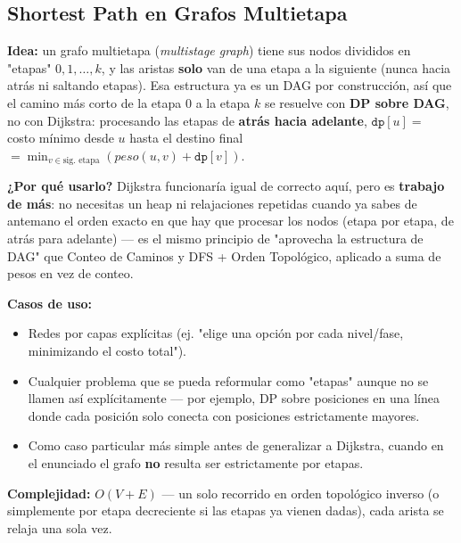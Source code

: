 \documentclass[10pt,a4paper,twocolumn]{article}
\begin{document}
\subsection{Shortest Path en Grafos Multietapa}

\textbf{Idea:} un grafo multietapa (\textit{multistage graph}) tiene
sus nodos divididos en "etapas" $0, 1, \dots, k$, y las aristas
\textbf{solo} van de una etapa a la siguiente (nunca hacia atrás ni
saltando etapas). Esa estructura ya es un DAG por construcción, así
que el camino más corto de la etapa $0$ a la etapa $k$ se resuelve
con \textbf{DP sobre DAG}, no con Dijkstra: procesando las etapas de
\textbf{atrás hacia adelante}, $\texttt{dp}[u] = $ costo mínimo desde
$u$ hasta el destino final $= \min_{v \in \text{sig. etapa}}
(peso(u,v) + \texttt{dp}[v])$.

\textbf{¿Por qué usarlo?} Dijkstra funcionaría igual de correcto
aquí, pero es \textbf{trabajo de más}: no necesitas un heap ni
relajaciones repetidas cuando ya sabes de antemano el orden exacto en
que hay que procesar los nodos (etapa por etapa, de atrás para
adelante) — es el mismo principio de "aprovecha la estructura de DAG"
que Conteo de Caminos y DFS + Orden Topológico, aplicado a suma de
pesos en vez de conteo.

\textbf{Casos de uso:}

\begin{itemize}
	\item Redes por capas explícitas (ej. "elige una opción por cada
	nivel/fase, minimizando el costo total").
	\item Cualquier problema que se pueda reformular como "etapas"
	aunque no se llamen así explícitamente — por ejemplo, DP sobre
	posiciones en una línea donde cada posición solo conecta con
	posiciones estrictamente mayores.
	\item Como caso particular más simple antes de generalizar a
	Dijkstra, cuando en el enunciado el grafo \textbf{no} resulta ser
	estrictamente por etapas.
\end{itemize}

\textbf{Complejidad:} $O(V + E)$ — un solo recorrido en orden
topológico inverso (o simplemente por etapa decreciente si las
etapas ya vienen dadas), cada arista se relaja una sola vez.
\end{document}
